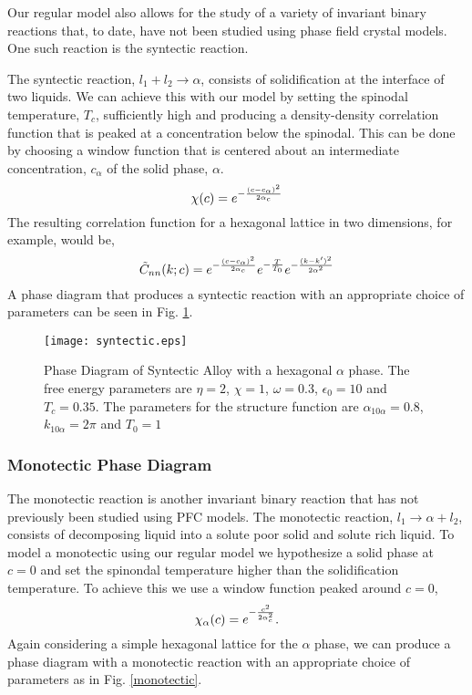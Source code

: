 Our regular model also allows for the study of a variety of invariant binary
reactions that, to date, have not been studied using phase field crystal
models. One such reaction is the syntectic reaction. 

The syntectic reaction, $l_1 + l_2 \rightarrow \alpha $, consists of
solidification at the interface of two liquids. We can achieve this with our
model by setting the spinodal temperature, $T_c$, sufficiently high and
producing a density-density correlation function that is peaked at a
concentration below the spinodal. This can be done by choosing a window
function that is centered about an intermediate concentration, $c_\alpha$ of
the solid phase, $\alpha$. 
%
\begin{equation}
  \chi(c) = e^{- \frac{(c - c_\alpha)^2}{2 \alpha_c}}
\end{equation}
%
The resulting correlation function for a hexagonal lattice in two dimensions,
for example, would be,
%
\begin{equation}
  \tilde{C}_{nn}(k; c) = 
    e^{-\frac{(c - c_\alpha)^2}{2 \alpha_c}}
    e^{-\frac{T}{T_0}} 
    e^{-\frac{(k - k^\prime)^2}{2\alpha^2}}
\end{equation}
%
A phase diagram that produces a syntectic reaction with an appropriate choice
of parameters can be seen in Fig. \ref{syntectic}.

\begin{figure}
    \centering
	\texttt{[image: syntectic.eps]}
	\caption{
        \label{syntectic} Phase Diagram of Syntectic Alloy with a hexagonal
        $\alpha$ phase. The free energy parameters are $\eta=2$, $\chi=1$,
        $\omega=0.3$, $\epsilon_0 = 10$ and $T_c=0.35$. The parameters for the
        structure function are $\alpha_{10\alpha} = 0.8$, $k_{10\alpha} = 2\pi$
        and $T_0 = 1$
    }
\end{figure}

\subsubsection{Monotectic Phase Diagram} %

The monotectic reaction is another invariant binary reaction that has not
previously been studied using PFC models. The monotectic reaction, $l_1
\rightarrow \alpha + l_2$, consists of decomposing liquid into a solute poor
solid and solute rich liquid. To model a monotectic using our regular model we
hypothesize a solid phase at $c=0$ and set the spinondal temperature higher
than the solidification temperature. To achieve this we use a window function
peaked around $c = 0$,
%
\begin{equation}
    \chi_\alpha(c) = e^{-\frac{c^2}{2\alpha_c^2}}.
\end{equation}
%
Again considering a simple hexagonal lattice for the $\alpha$ phase, we can
produce a phase diagram with a monotectic reaction with an appropriate choice
of parameters as in Fig. \ref{monotectic}.

